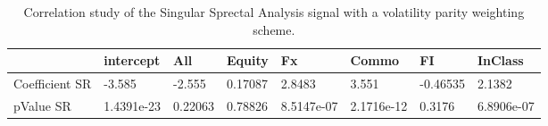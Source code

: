 \begin{table}[H]
\centering
\begin{tabular}{llllllll}
& intercept & All & Equity & Fx & Commo & FI & InClass \\ 
\hline 
Coefficient SR & -3.585 & -2.555 & 0.17087 & 2.8483 & 3.551 & -0.46535 & 2.1382 \\ 
pValue SR & 1.4391e-23 & 0.22063 & 0.78826 & 8.5147e-07 & 2.1716e-12 & 0.3176 & 6.8906e-07 \\ 
\hline
\end{tabular}
\caption{Correlation study of the Singular Sprectal Analysis signal with a volatility parity weighting scheme.}
\label{SSA_CORR}
\end{table}